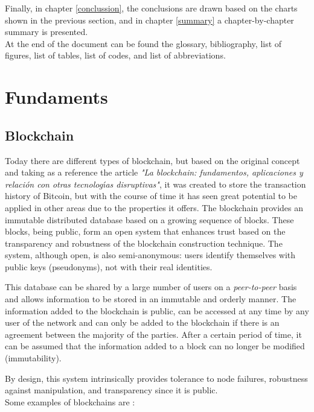 \documentclass[MSE,Master,english]{twbook}%
\begin{document}
Finally, in chapter \ref{conclussion}, the conclusions are drawn based on the charts shown in the previous section, and in chapter \ref{summary} a chapter-by-chapter summary is presented. \\

At the end of the document can be found the glossary, bibliography, list of figures, list of tables, list of codes, and list of abbreviations.
\clearpage

\chapter{Fundaments\label{basics}}
\section{Blockchain}
Today there are different types of blockchain, but based on the original concept and taking as a reference the article \emph{"La blockchain: fundamentos, aplicaciones y relaci{\'o}n con otras tecnolog{\'\i}as disruptivas"}\cite{blockchain}, it was created to store the transaction history of Bitcoin, but with the course of time it has seen great potential to be applied in other areas due to the properties it offers. The blockchain provides an immutable distributed database based on a growing sequence of blocks. These blocks, being public, form an open system that enhances trust based on the transparency and robustness of the blockchain construction technique. The system, although open, is also semi-anonymous: users identify themselves with public keys (pseudonyms), not with their real identities.

This database can be shared by a large number of users on a \emph{peer-to-peer} basis and allows information to be stored in an immutable and orderly manner. The information added to the blockchain is public, can be accessed at any time by any user of the network and can only be added to the blockchain if there is an agreement between the majority of the parties. After a certain period of time, it can be assumed that the information added to a block can no longer be modified (immutability).

By design, this system intrinsically provides tolerance to node failures, robustness against manipulation, and transparency since it is public. \\

Some examples of blockchains are \cite{blockchainDummies}:
\end{document}
